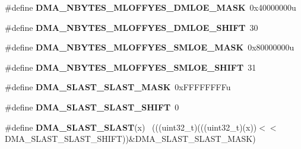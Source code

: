 \begin{DoxyCompactItemize}
\item 
\hypertarget{group___d_m_a___register___masks_ga76a7714303966593beffe85120eb3620}{}\#define {\bfseries D\+M\+A\+\_\+\+N\+B\+Y\+T\+E\+S\+\_\+\+M\+L\+O\+F\+F\+Y\+E\+S\+\_\+\+D\+M\+L\+O\+E\+\_\+\+M\+A\+S\+K}~0x40000000u\label{group___d_m_a___register___masks_ga76a7714303966593beffe85120eb3620}

\item 
\hypertarget{group___d_m_a___register___masks_ga6a2d840f400f7f2e0bff92c1696d933b}{}\#define {\bfseries D\+M\+A\+\_\+\+N\+B\+Y\+T\+E\+S\+\_\+\+M\+L\+O\+F\+F\+Y\+E\+S\+\_\+\+D\+M\+L\+O\+E\+\_\+\+S\+H\+I\+F\+T}~30\label{group___d_m_a___register___masks_ga6a2d840f400f7f2e0bff92c1696d933b}

\item 
\hypertarget{group___d_m_a___register___masks_ga3fc0c1eff32a41d0111c33ae3ba4c130}{}\#define {\bfseries D\+M\+A\+\_\+\+N\+B\+Y\+T\+E\+S\+\_\+\+M\+L\+O\+F\+F\+Y\+E\+S\+\_\+\+S\+M\+L\+O\+E\+\_\+\+M\+A\+S\+K}~0x80000000u\label{group___d_m_a___register___masks_ga3fc0c1eff32a41d0111c33ae3ba4c130}

\item 
\hypertarget{group___d_m_a___register___masks_ga35f2f83a6af667046813440107156960}{}\#define {\bfseries D\+M\+A\+\_\+\+N\+B\+Y\+T\+E\+S\+\_\+\+M\+L\+O\+F\+F\+Y\+E\+S\+\_\+\+S\+M\+L\+O\+E\+\_\+\+S\+H\+I\+F\+T}~31\label{group___d_m_a___register___masks_ga35f2f83a6af667046813440107156960}

\item 
\hypertarget{group___d_m_a___register___masks_ga5bf83d5a89fb81000526efccd2390490}{}\#define {\bfseries D\+M\+A\+\_\+\+S\+L\+A\+S\+T\+\_\+\+S\+L\+A\+S\+T\+\_\+\+M\+A\+S\+K}~0x\+F\+F\+F\+F\+F\+F\+F\+Fu\label{group___d_m_a___register___masks_ga5bf83d5a89fb81000526efccd2390490}

\item 
\hypertarget{group___d_m_a___register___masks_ga3cfd6e1dd2ee3e538fe847f51c51e9e9}{}\#define {\bfseries D\+M\+A\+\_\+\+S\+L\+A\+S\+T\+\_\+\+S\+L\+A\+S\+T\+\_\+\+S\+H\+I\+F\+T}~0\label{group___d_m_a___register___masks_ga3cfd6e1dd2ee3e538fe847f51c51e9e9}

\item 
\hypertarget{group___d_m_a___register___masks_ga392b85b8be87f75edafed5617871e351}{}\#define {\bfseries D\+M\+A\+\_\+\+S\+L\+A\+S\+T\+\_\+\+S\+L\+A\+S\+T}(x)                                          ~(((uint32\+\_\+t)(((uint32\+\_\+t)(x))$<$$<$D\+M\+A\+\_\+\+S\+L\+A\+S\+T\+\_\+\+S\+L\+A\+S\+T\+\_\+\+S\+H\+I\+F\+T))\&D\+M\+A\+\_\+\+S\+L\+A\+S\+T\+\_\+\+S\+L\+A\+S\+T\+\_\+\+M\+A\+S\+K)\label{group___d_m_a___register___masks_ga392b85b8be87f75edafed5617871e351}


\end{DoxyCompactItemize}
